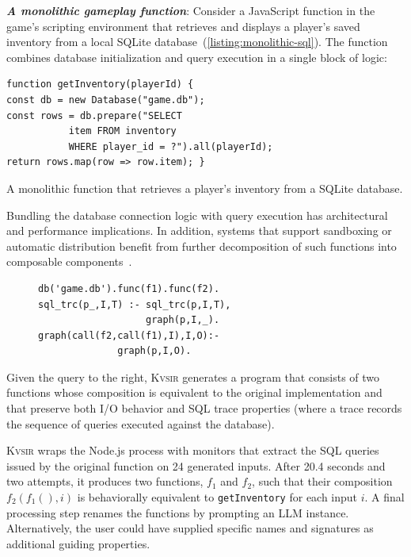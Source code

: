 \documentclass[sigplan,review,anonymous,10pt]{acmart}
\newcommand{\sys}{{\scshape Kv{\textalpha}sir}\xspace}
\newcommand{\heading}[1]{\vspace{2pt}\noindent\textbf{\emph{#1}}:\enspace}
\begin{document}
\heading{A monolithic gameplay function}
Consider a JavaScript function in the game's scripting environment that
retrieves and displays a player's saved inventory from a local SQLite database~(\cref{listing:monolithic-sql}).
The function combines database initialization and query execution in a single
block of logic:

\begin{listing}
\begin{verbatim}
function getInventory(playerId) {
const db = new Database("game.db");
const rows = db.prepare("SELECT
           item FROM inventory
           WHERE player_id = ?").all(playerId);
return rows.map(row => row.item); }
\end{verbatim}
\caption{A monolithic function that retrieves a player's inventory from a SQLite database.}
\label{listing:monolithic-sql}
\end{listing}

Bundling the database connection logic with query execution has architectural
and performance implications. In addition, systems that support sandboxing or
automatic distribution benefit from further decomposition of such functions
into composable components~\cite{Towards_Modern_Ghemaw_2023, vasilakis2019ignis, vasilakis2018breakapp}.

\begin{figure}
  \begin{verbatim}
db('game.db').func(f1).func(f2).
sql_trc(p_,I,T) :- sql_trc(p,I,T),
                   graph(p,I,_).
graph(call(f2,call(f1),I),I,O):-
              graph(p,I,O).
  \end{verbatim}
\end{figure}

Given the query to the right, \sys generates a program that consists of two
functions whose composition is equivalent to the original implementation and
that preserve both I/O behavior and SQL trace properties (where a trace records
the sequence of queries executed against the database).

\sys wraps the Node.js process with monitors that extract the SQL queries
issued by the original function on 24 generated inputs.
After 20.4 seconds and
two attempts, it produces two functions, $f_1$ and $f_2$, such that their
composition $f_2(f_1(), i)$ is behaviorally equivalent to \texttt{getInventory}
for each input $i$.
A final processing step renames the functions by prompting
an LLM instance.
Alternatively, the user could have supplied specific names and
signatures as additional guiding properties.
\end{document}
